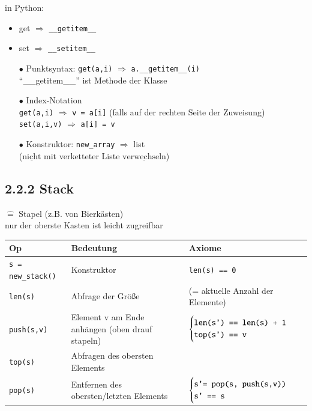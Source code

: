 \documentclass[11pt, fleqn]{scrreprt}
\begin{document}
    in Python:
    \begin{itemize}[label={}]
        \item get $\Rightarrow$ \verb|__getitem__|
        \item set $\Rightarrow$ \verb|__setitem__|
        \item[$\bullet$] Punktsyntax: \verb|get(a,i)| $\Rightarrow$ \verb|a.__getitem__(i)| \\
        ``\_\_getitem\_\_'' ist Methode der Klasse
        \item[$\bullet$] Index-Notation \\
        \verb|get(a,i)| $\Rightarrow$ \verb|v = a[i]| (falls auf der rechten Seite der Zuweisung) \\
        \verb|set(a,i,v)| $\Rightarrow$ \verb|a[i] = v|
        \item[$\bullet$] Konstruktor: \verb|new_array| $\Rightarrow$ list \\
        ($\underline{\text{nicht}}$ mit verketteter Liste $\underline{\text{verwechseln}}$)
    \end{itemize}

    \subsection*{2.2.2 Stack}
    $\widehat{=}$ Stapel (z.B. von Bierkästen) \\
    nur der oberste Kasten ist leicht zugreifbar \\

    \begin{tabular}{C{5cm} C{5cm} C{5cm}}
        Op & Bedeutung & Axiome \\ \hline
        \verb|s = new_stack()| & Konstruktor & \verb|len(s) == 0| \\
        \verb|len(s)| & Abfrage der Größe & (= aktuelle Anzahl der Elemente) \\
        \verb|push(s,v)| & Element v am Ende anhängen (oben drauf stapeln) & $\begin{cases}
        \verb|len(s') == len(s) + 1| \\
        \verb|top(s') == v|
        \end{cases}$ \\
        \verb|top(s)| & Abfragen des obersten Elements & \\
        \verb|pop(s)| & Entfernen des obersten/letzten Elements & $\begin{cases}
        \verb|s'= pop(s, push(s,v))| \\
        \verb|s' == s| \end{cases}$ \\
    \end{tabular} \\
\end{document}

